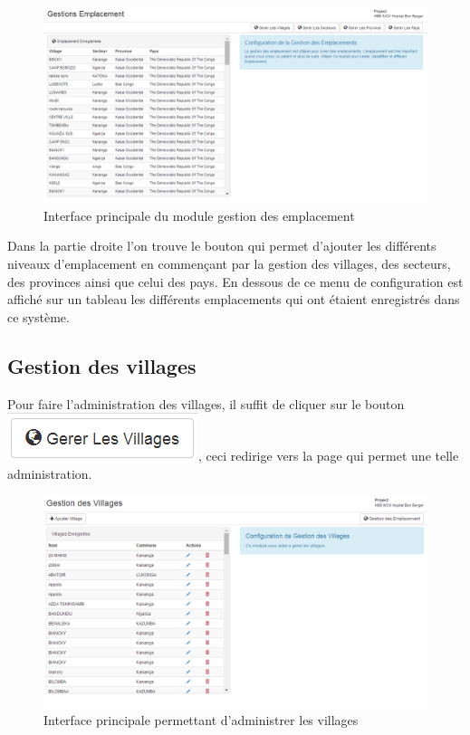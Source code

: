 \documentclass[12pt,a4paper]{report}
\begin{document}
\begin{figure}[h]
\begin{center}
\includegraphics[width=14cm]{pic/AdminLocalisation.png}
\end{center}
\caption{Interface principale du module gestion des emplacement}
\label{Interface principale du module gestion des emplacement}
\end{figure}

Dans la partie droite l'on trouve le bouton qui permet d'ajouter les différents niveaux d'emplacement en commençant par la gestion des villages, des secteurs, des provinces ainsi que celui des pays. En dessous de ce menu de configuration est affiché sur un tableau les différents emplacements qui ont étaient enregistrés dans ce système. 
\newpage
\subsection{Gestion des villages}
Pour faire l'administration des villages, il suffit de cliquer sur le bouton\\ \includegraphics[scale=0.7]{pic/GererVillage.png}, ceci redirige vers la page qui permet une telle administration.

\begin{figure}[h]
\begin{center}
\includegraphics[width=14cm]{pic/AdminVillage.png}
\end{center}
\caption{Interface principale permettant d'administrer les villages}
\label{Interface principale permettant d'administrer les villages}
\end{figure}
\end{document}
